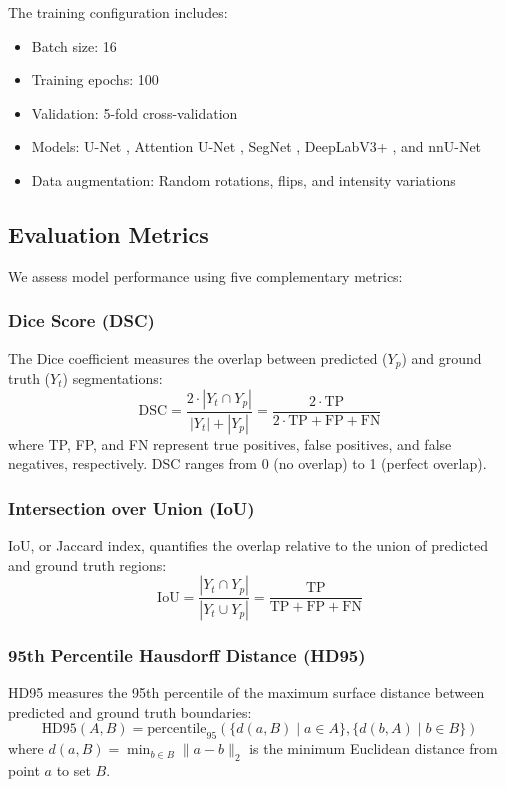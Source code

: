 \documentclass[review]{elsarticle}
\begin{document}
The training configuration includes:
\begin{itemize}
    \item Batch size: 16
    \item Training epochs: 100
    \item Validation: 5-fold cross-validation
    \item Models: U-Net \cite{Ronneberger2015}, Attention U-Net \cite{oktay2018}, SegNet \cite{badrinarayanan2017segnet}, DeepLabV3+ \cite{chen2018encoder}, and nnU-Net \cite{isensee2021nnu}
    \item Data augmentation: Random rotations, flips, and intensity variations
\end{itemize}

\subsection{Evaluation Metrics}
We assess model performance using five complementary metrics:

\subsubsection{Dice Score (DSC)}
The Dice coefficient measures the overlap between predicted ($Y_p$) and ground truth ($Y_t$) segmentations:
\begin{equation}
    \text{DSC} = \frac{2 \cdot |Y_t \cap Y_p|}{|Y_t| + |Y_p|} = \frac{2 \cdot \text{TP}}{2 \cdot \text{TP} + \text{FP} + \text{FN}}
\end{equation}
where TP, FP, and FN represent true positives, false positives, and false negatives, respectively. DSC ranges from 0 (no overlap) to 1 (perfect overlap).

\subsubsection{Intersection over Union (IoU)}
IoU, or Jaccard index, quantifies the overlap relative to the union of predicted and ground truth regions:
\begin{equation}
    \text{IoU} = \frac{|Y_t \cap Y_p|}{|Y_t \cup Y_p|} = \frac{\text{TP}}{\text{TP} + \text{FP} + \text{FN}}
\end{equation}

\subsubsection{95th Percentile Hausdorff Distance (HD95)}
HD95 measures the 95th percentile of the maximum surface distance between predicted and ground truth boundaries:
\begin{equation}
    \text{HD95}(A,B) = \text{percentile}_{95} \left( \{d(a, B) \mid a \in A\}, \{d(b, A) \mid b \in B\} \right)
\end{equation}
where $d(a,B) = \min_{b \in B} \|a - b\|_2$ is the minimum Euclidean distance from point $a$ to set $B$.
\end{document}
